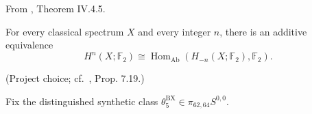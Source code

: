 \begin{definition}
\label{frontier:Literature:87014c07c847}
From \cite{EKMM}, Theorem IV.4.5.\par

For every classical spectrum $X$ and every integer $n$, there is an additive equivalence\[H^n(X;\mathbb F_2)\cong\operatorname{Hom}_{\mathrm{Ab}}(H_{-n}(X;\mathbb F_2),\mathbb F_2).\]
\end{definition}

\begin{definition}
\label{frontier:Literature:9e21a71352a4}
(Project choice; cf.\ \cite{BurklundXu}, Prop. 7.19.)\par{}

Fix the distinguished synthetic class $\theta_5^{\mathrm{BX}}\in\pi_{62,64}S^{0,0}$.
\end{definition}

